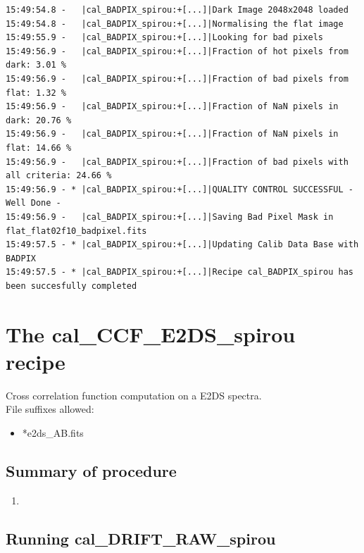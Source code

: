 \begin{lstlisting}[style=text]
15:49:54.8 -   |cal_BADPIX_spirou:+[...]|Dark Image 2048x2048 loaded
15:49:54.8 -   |cal_BADPIX_spirou:+[...]|Normalising the flat image
15:49:55.9 -   |cal_BADPIX_spirou:+[...]|Looking for bad pixels
15:49:56.9 -   |cal_BADPIX_spirou:+[...]|Fraction of hot pixels from dark: 3.01 %
15:49:56.9 -   |cal_BADPIX_spirou:+[...]|Fraction of bad pixels from flat: 1.32 %
15:49:56.9 -   |cal_BADPIX_spirou:+[...]|Fraction of NaN pixels in dark: 20.76 %
15:49:56.9 -   |cal_BADPIX_spirou:+[...]|Fraction of NaN pixels in flat: 14.66 %
15:49:56.9 -   |cal_BADPIX_spirou:+[...]|Fraction of bad pixels with all criteria: 24.66 %
15:49:56.9 - * |cal_BADPIX_spirou:+[...]|QUALITY CONTROL SUCCESSFUL - Well Done -
15:49:56.9 -   |cal_BADPIX_spirou:+[...]|Saving Bad Pixel Mask in flat_flat02f10_badpixel.fits
15:49:57.5 - * |cal_BADPIX_spirou:+[...]|Updating Calib Data Base with BADPIX
15:49:57.5 - * |cal_BADPIX_spirou:+[...]|Recipe cal_BADPIX_spirou has been succesfully completed
\end{lstlisting}


\clearpage
\newpage
\section{The cal\_CCF\_E2DS\_spirou recipe}
\label{section:cal_CCF_E2DS_spirou}

Cross correlation function computation on a E2DS spectra. \\


\noindent File suffixes allowed:
\begin{itemize}
	\item *e2ds\_AB.fits
\end{itemize}

\subsection{Summary of procedure}
\begin{enumerate}
	\item 
\end{enumerate}

\subsection{Running cal\_DRIFT\_RAW\_spirou}

